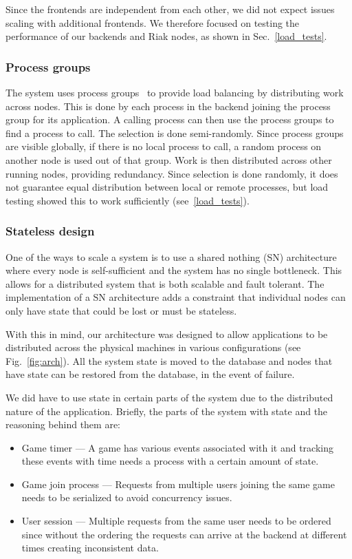 \documentclass[11pt,a4paper]{report}
\begin{document}
Since the frontends are independent from each other, we did not expect issues
scaling with additional frontends. We therefore focused on testing the performance
of our backends and Riak nodes, as shown in Sec.~\ref{load_tests}.

\subsubsection{Process groups}
\label{sec:process_groups}
The system uses process groups~\cite{process_groups} to provide load balancing by
distributing work across nodes.
This is done by each process in the backend joining the process group for its
application. A calling process can then use the process groups to find a
process to call. The selection is done semi-randomly. Since process groups are
visible globally, if there is no local process to call, a random process on
another node is used out of that group.
Work is then distributed across other running nodes, providing redundancy. Since
selection is done randomly, it does not guarantee equal distribution between local
or remote processes, but load testing showed this to work sufficiently
(see~\ref{load_tests}).

\subsubsection{Stateless design}
\label{sec:stateless}
One of the ways to scale a system is to use a shared nothing (SN)
architecture~\cite{sn_arch}
where every node is self-sufficient and the system has no single bottleneck.
This allows for a distributed system that is both scalable and fault tolerant.
The implementation of a SN architecture adds a constraint that individual
nodes can only have state that could be lost or must be stateless.

With this in mind, our architecture was designed to allow applications to
be distributed across the physical machines in various configurations
(see Fig.~\ref{fig:arch}). All the system state is moved to the database
and nodes that have state can be restored from the database, in
the event of failure.

We did have to use state in certain parts of the system due to the
distributed nature of the application. Briefly, the parts of the system
with state and the reasoning behind them are:

\begin{itemize}
\item Game timer --- A game has various events associated with it and
tracking these events with time needs a process with a certain amount
of state.
\item Game join process --- Requests from multiple users joining the same
game needs to be serialized to avoid concurrency issues.
\item User session --- Multiple requests from the same user needs to be
ordered since without the ordering the requests can arrive at the backend
at different times creating inconsistent data.
\end{itemize}
\end{document}
